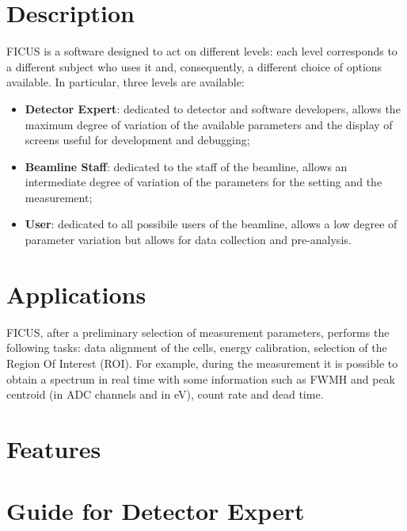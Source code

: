 \documentclass[a4paper,12pt,oneside,pdflatex,italian,final,twocolumn]{article}
\begin{document}
	\clearpage
	
	        \section{Description}
        
       FICUS is a software designed to act on different levels: each level corresponds to a different subject who uses it and, consequently, a different choice of options available. In particular, three levels are available:
       \begin{itemize}
           \item \textbf{Detector Expert}: dedicated to detector and software developers, allows the maximum degree of variation of the available parameters and the display of screens useful for development and debugging;
           \item \textbf{Beamline Staff}: dedicated to the staff of the beamline, allows an intermediate degree of variation of the parameters for the setting and the measurement;
           \item \textbf{User}: dedicated to all possibile users of the beamline, allows a low degree of parameter variation but allows for data collection and pre-analysis.
       \end{itemize}
       
        \section{Applications}
        
        FICUS, after a preliminary selection of measurement parameters, performs the following tasks: data alignment of the cells, energy calibration, selection of the Region Of Interest (ROI). For example, during the measurement it is possible to obtain a spectrum in real time with some information such as FWMH and peak centroid (in ADC channels and in eV), count rate and dead time.
        
        \section{Features}
            \clearpage
	
\section{Guide for Detector Expert}
\end{document}
